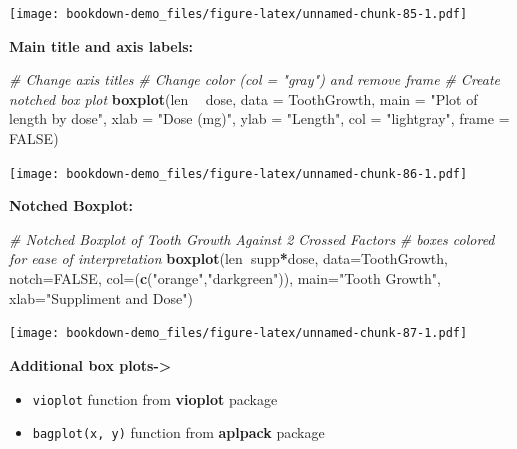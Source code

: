 \documentclass[]{book}
\newenvironment{Shaded}{\begin{snugshade}}{\end{snugshade}}
\newcommand{\KeywordTok}[1]{\textcolor[rgb]{0.13,0.29,0.53}{\textbf{#1}}}
\newcommand{\DataTypeTok}[1]{\textcolor[rgb]{0.13,0.29,0.53}{#1}}
\newcommand{\StringTok}[1]{\textcolor[rgb]{0.31,0.60,0.02}{#1}}
\newcommand{\CommentTok}[1]{\textcolor[rgb]{0.56,0.35,0.01}{\textit{#1}}}
\newcommand{\OtherTok}[1]{\textcolor[rgb]{0.56,0.35,0.01}{#1}}
\newcommand{\OperatorTok}[1]{\textcolor[rgb]{0.81,0.36,0.00}{\textbf{#1}}}
\newcommand{\NormalTok}[1]{#1}
\providecommand{\tightlist}{%
  \setlength{\itemsep}{0pt}\setlength{\parskip}{0pt}}
\begin{document}
\texttt{[image: bookdown-demo\_files/figure-latex/unnamed-chunk-85-1.pdf]}

\textbf{Main title and axis labels:}

\begin{Shaded}
\begin{Highlighting}[]
\CommentTok{# Change axis titles}
\CommentTok{# Change color (col = "gray") and remove frame}
\CommentTok{# Create notched box plot}
\KeywordTok{boxplot}\NormalTok{(len }\OperatorTok{~}\StringTok{ }\NormalTok{dose, }\DataTypeTok{data =}\NormalTok{ ToothGrowth,}
        \DataTypeTok{main =} \StringTok{"Plot of length by dose"}\NormalTok{,}
        \DataTypeTok{xlab =} \StringTok{"Dose (mg)"}\NormalTok{, }\DataTypeTok{ylab =} \StringTok{"Length"}\NormalTok{,}
        \DataTypeTok{col =} \StringTok{"lightgray"}\NormalTok{, }\DataTypeTok{frame =} \OtherTok{FALSE}\NormalTok{)}
\end{Highlighting}
\end{Shaded}

\texttt{[image: bookdown-demo\_files/figure-latex/unnamed-chunk-86-1.pdf]}

\textbf{Notched Boxplot:}

\begin{Shaded}
\begin{Highlighting}[]
\CommentTok{# Notched Boxplot of Tooth Growth Against 2 Crossed Factors}
\CommentTok{# boxes colored for ease of interpretation }
\KeywordTok{boxplot}\NormalTok{(len}\OperatorTok{~}\NormalTok{supp}\OperatorTok{*}\NormalTok{dose, }\DataTypeTok{data=}\NormalTok{ToothGrowth, }\DataTypeTok{notch=}\OtherTok{FALSE}\NormalTok{, }
  \DataTypeTok{col=}\NormalTok{(}\KeywordTok{c}\NormalTok{(}\StringTok{"orange"}\NormalTok{,}\StringTok{"darkgreen"}\NormalTok{)),}
  \DataTypeTok{main=}\StringTok{"Tooth Growth"}\NormalTok{, }\DataTypeTok{xlab=}\StringTok{"Suppliment and Dose"}\NormalTok{)}
\end{Highlighting}
\end{Shaded}

\texttt{[image: bookdown-demo\_files/figure-latex/unnamed-chunk-87-1.pdf]}

\textbf{Additional box plots-\textgreater{}}

\begin{itemize}
\tightlist
\item
  \texttt{vioplot} function from \textbf{vioplot} package
\item
  \texttt{bagplot(x,\ y)} function from \textbf{aplpack} package
\end{itemize}
\end{document}

